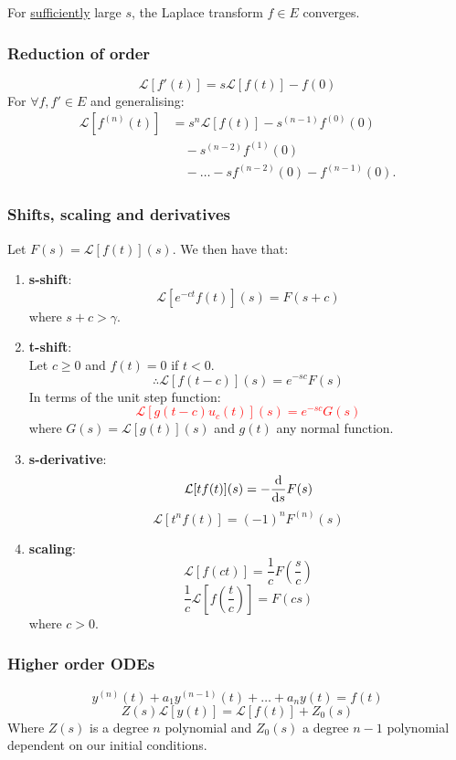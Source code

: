 \documentclass{article}
\begin{document}
\begin{multicols}{3}
For \underline{sufficiently} large $s$, the Laplace transform
$f\in E$ converges.

\subsubsection*{Reduction of order}
$$\mathcal{L}[f'(t)]=s\mathcal{L}[f(t)]-f(0)$$
For $\forall f,f'\in E$ and generalising:
\begin{align*}
    \mathcal{L}[f^{(n)}(t)]
    &=s^n\mathcal{L}[f(t)]
    -s^{(n-1)}f^{(0)}(0) \\
    &\quad-s^{(n-2)}f^{(1)}(0) \\
    &\quad-\dots-sf^{(n-2)}(0)-f^{(n-1)}(0).
\end{align*}

\subsubsection*{Shifts, scaling and derivatives}
Let $F(s)=\mathcal{L}[f(t)](s)$.
We then have that:
\begin{enumerate}
    \item \textbf{s-shift}:
    $$\mathcal{L}[e^{-ct}f(t)](s)=F(s+c)$$
    where $s+c>\gamma$.
    \item \textbf{t-shift}: \\
    Let $c\geq0$ and $f(t)=0$ if $t<0$.
    $$\therefore\mathcal{L}[f(t-c)](s)=e^{-sc}F(s)$$
    In terms of the unit step function:
    \textcolor{red}{$$\mathcal{L}
    [g(t-c)u_c(t)](s)=e^{-sc}G(s)$$}where $G(s)=\mathcal{L}[g(t)](s)$
    and $g(t)$ any normal function.

    \item \textbf{s-derivative}:
    $$\mathcal{L}[tf(t)](s)=-\dv{s}F(s)$$
    $$\mathcal{L}[t^n f(t)]
    =(-1)^n F^{(n)}(s)$$

    \item \textbf{scaling}:
    $$\mathcal{L}[f(ct)]=\frac{1}{c}F(\frac{s}{c})$$
    $$\frac{1}{c}\mathcal{L}[f(\frac{t}{c})]=F(cs)$$
    where $c>0$.
\end{enumerate}

\subsubsection*{Higher order ODEs}
$$y^{(n)}(t)+a_1y^{(n-1)}(t)+\dots
+a_n y(t)=f(t)$$
$$Z(s)\mathcal{L}[y(t)]
=\mathcal{L}[f(t)]+Z_0(s)$$
Where $Z(s)$ is a degree $n$ polynomial
and $Z_0(s)$ a degree $n-1$ polynomial dependent on our 
initial conditions.


\end{multicols}
\end{document}
